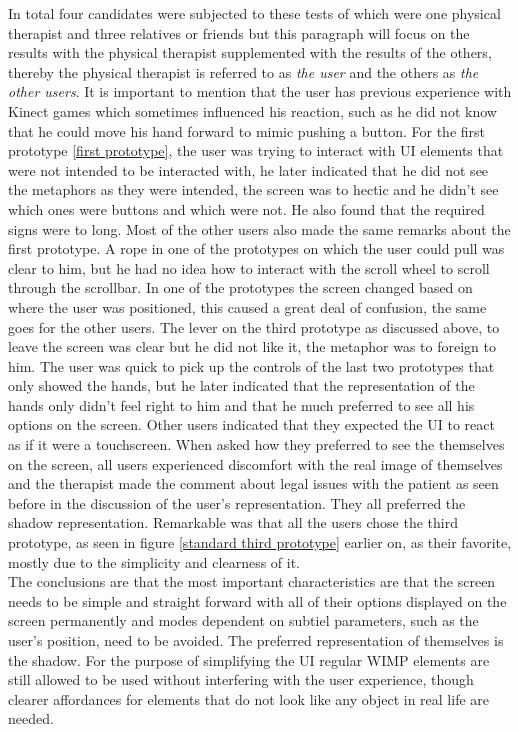 In total four candidates were subjected to these tests of which were one physical therapist and three relatives or friends but this paragraph will focus on the results with the physical therapist supplemented with the results of the others, thereby the physical therapist is referred to as \emph{the user} and the others as \emph{the other users}. It is important to mention that the user has previous experience with Kinect games which sometimes influenced his reaction, such as he did not know that he could move his hand forward to mimic pushing a button. For the first prototype  \ref{first prototype}, the user was trying to interact with UI elements that were not intended to be interacted with, he later indicated that he did not see the metaphors as they were intended, the screen was to hectic and he didn't see which ones were buttons and which were not. He also found that the required signs were to long. Most of the other users also made the same remarks about the first prototype. A rope in one of the prototypes on which the user could pull was clear to him, but he had no idea how to interact with the scroll wheel to scroll through the scrollbar. In one of the prototypes the screen changed based on where the user was positioned, this caused a great deal of confusion, the same goes for the other users. The lever on the third prototype as discussed above, to leave the screen was clear but he did not like it, the metaphor was to foreign to him. The user was quick to pick up the controls of the last two prototypes that only showed the hands, but he later indicated that the representation of the hands only didn't feel right to him and that he much preferred to see all his options on the screen. Other users indicated that they expected the UI to react as if it were a touchscreen. When asked how they preferred to see the themselves on the screen, all users experienced discomfort with the real image of themselves and the therapist made the comment about legal issues with the patient as seen before in the discussion of the user's representation. They all preferred the shadow representation.  Remarkable was that all the users chose the third prototype, as seen in figure \ref{standard third prototype} earlier on, as their favorite, mostly due to the simplicity and clearness of it.\\

The conclusions are that the most important characteristics are that the screen needs to be simple and straight forward with all of their options displayed on the screen permanently and modes dependent on subtiel parameters, such as the user's position, need to be avoided. The preferred representation of themselves is the shadow. For the purpose of simplifying the UI regular WIMP elements are still allowed to be used without interfering with the user experience, though clearer affordances for elements that do not look like any object in real life are needed.\\

